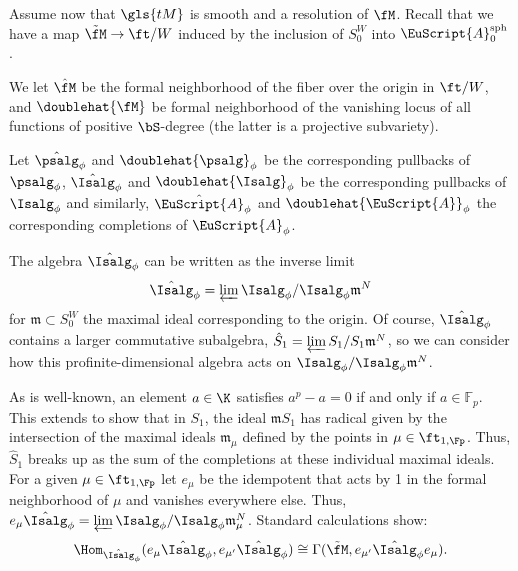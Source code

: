 Assume now that $\gls{tM}$ is smooth and a resolution of $\fM$. Recall that we have a map $\tilde{\fM}\to \ft/W$ induced by the inclusion of $S_0^W$ into
$\EuScript{A}_0^{\operatorname{sph}}$.
\begin{definition}
  We let $\hat{\fM}$ be the formal neighborhood of the fiber over the origin in $\ft/W$, and $\doublehat{\fM}$ be formal neighborhood of the vanishing locus of all functions of positive $\bS$-degree (the latter is a projective subvariety).

 Let $\hat{\psalg}_\phi$ and $\doublehat{\psalg}_\phi$ be the corresponding pullbacks of $ \psalg_\phi$, $\hat{\Isalg}_\phi$ and $\doublehat{\Isalg}_\phi$ be the corresponding pullbacks of $ \Isalg_\phi$ and similarly, $\hat{\EuScript{A}}_\phi$ and $\doublehat{\EuScript{A}}_\phi$ the corresponding completions of $ \EuScript{A}_{\phi}$.
\end{definition}




The algebra $\hat{\Isalg}_\phi$ can be written as the inverse limit
\[\hat{\Isalg}_\phi=\varprojlim {\Isalg}_\phi/{\Isalg}_\phi\mathfrak{m}^N\] for
$\mathfrak{m}\subset S_0^W$ the maximal ideal corresponding to the
origin.  Of course, $\hat{\Isalg}_\phi$ contains a larger commutative
subalgebra, $\hat{S}_1=\varprojlim {S}_1/{S}_1\mathfrak{m}^N$, so we can consider how this profinite-dimensional algebra acts on
${\Isalg}_\phi/{\Isalg}_\phi\mathfrak{m}^N$.

As is well-known, an element $a\in \K$ satisfies $a^p-a=0$ if and only if $a\in \mathbb{F}_p$.
This extends to show that in 
$S_1$, the ideal $\mathfrak{m}S_1$ has radical given by the intersection of the maximal ideals $\mathfrak{m}_{\mu}$ defined by the points in $\mu \in \ft_{1,\Fp}$.  Thus, $\hat{S}_1$ breaks up as the sum of the completions at these individual maximal ideals.  For a given $\mu\in \ft_{1,\Fp}$ let $e_{\mu}$ be the idempotent that acts by 1 in the formal neighborhood of $\mu$ and vanishes everywhere else.  Thus, $e_{\mu}\hat{\Isalg}_\phi =\varprojlim \Isalg_\phi/  \Isalg_\phi \mathfrak{m}_{\mu}^N$.  Standard calculations show:
\begin{equation}\label{eq:summand-hom}
  \Hom_{\hat{\Isalg}_\phi}(e_{\mu}\hat{\Isalg}_\phi, e_{\mu'}\hat{\Isalg}_\phi)\cong \Gamma(\tilde{\fM}, e_{\mu'}\hat{\Isalg}_\phi e_{\mu}).  
\end{equation}

